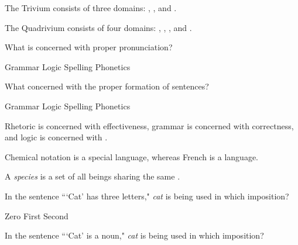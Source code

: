 \documentclass[answers]{exam}
\begin{document}
\begin{center}

\end{center}
\vspace{0.2in}
\begin{questions}
      
  \question The Trivium consists of three domains: \fillin[logic], \fillin[grammar], and \fillin[rhetoric].  
  
  \question The Quadrivium consists of four domains: \fillin[arithmetic], \fillin[geometry], \fillin[astronomy], and \fillin[music].  
  
   \question What is concerned with proper pronunciation?

      \begin{oneparchoices}
        \choice Grammar
        \choice Logic
        \choice Spelling
        \CorrectChoice Phonetics
      \end{oneparchoices}

   \question What concerned with the proper formation of sentences?

      \begin{oneparchoices}
        \CorrectChoice Grammar
        \choice Logic
        \choice Spelling
        \choice Phonetics
      \end{oneparchoices}

  \question Rhetoric is concerned with effectiveness, grammar is concerned with correctness, and logic is concerned with \fillin[truth].
  
  \question Chemical notation is a special language, whereas French is a \fillin[common] language.
  
  \question A \textit{species} is a set of all beings sharing the same \fillin[essence].
  
     \question In the sentence ```Cat' has three letters," \textit{cat} is being used in which imposition?

      \begin{oneparchoices}
        \CorrectChoice Zero
        \choice First
        \choice Second
      \end{oneparchoices}
      
     \question In the sentence ```Cat' is a noun," \textit{cat} is being used in which imposition?


\end{questions}
\end{document}
